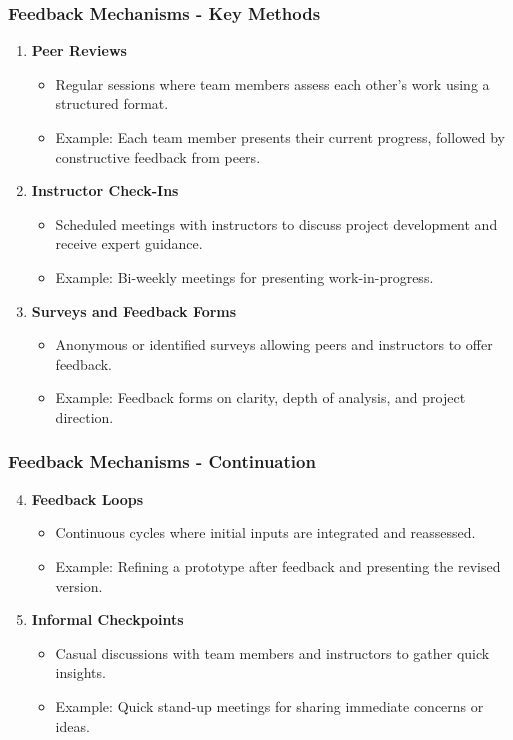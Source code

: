 \documentclass{beamer}
\begin{document}
\begin{frame}[fragile]
    \frametitle{Feedback Mechanisms - Key Methods}
    \begin{enumerate}
        \item \textbf{Peer Reviews}
            \begin{itemize}
                \item Regular sessions where team members assess each other’s work using a structured format.
                \item Example: Each team member presents their current progress, followed by constructive feedback from peers.
            \end{itemize}

        \item \textbf{Instructor Check-Ins}
            \begin{itemize}
                \item Scheduled meetings with instructors to discuss project development and receive expert guidance.
                \item Example: Bi-weekly meetings for presenting work-in-progress.
            \end{itemize}
            
        \item \textbf{Surveys and Feedback Forms}
            \begin{itemize}
                \item Anonymous or identified surveys allowing peers and instructors to offer feedback.
                \item Example: Feedback forms on clarity, depth of analysis, and project direction.
            \end{itemize}
    \end{enumerate}
\end{frame}

\begin{frame}[fragile]
    \frametitle{Feedback Mechanisms - Continuation}
    \begin{enumerate}
        \setcounter{enumi}{3} %
        \item \textbf{Feedback Loops}
            \begin{itemize}
                \item Continuous cycles where initial inputs are integrated and reassessed.
                \item Example: Refining a prototype after feedback and presenting the revised version.
            \end{itemize}
        
        \item \textbf{Informal Checkpoints}
            \begin{itemize}
                \item Casual discussions with team members and instructors to gather quick insights.
                \item Example: Quick stand-up meetings for sharing immediate concerns or ideas.
            \end{itemize}
    \end{enumerate}
\end{frame}
\end{document}
